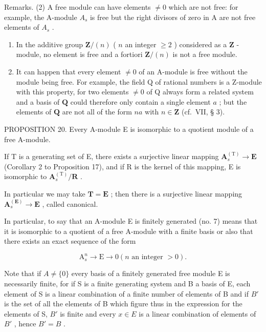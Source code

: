 Remarks. (2) A free module can have elements \(\neq0\) which are not free: for example, the A-module \(A_{s}\) is free but the right divisors of zero in A are not free elements of \(A_{s}\) .

\begin{enumerate}
\def\labelenumi{(\arabic{enumi})}
\setcounter{enumi}{2}
\item
  In the additive group \(\mathbf{Z} / (n)\) ( \(n\) an integer \(\geqslant 2\) ) considered as a \(\mathbf{Z}\) -module, no element is free and a fortiori \(\mathbf{Z} / (n)\) is not a free module.
\item
  It can happen that every element \(\neq0\) of an A-module is free without the module being free. For example, the field Q of rational numbers is a Z-module with this property, for two elements \(\neq0\) of Q always form a related system and a basis of \(\mathbf{Q}\) could therefore only contain a single element \(a\) ; but the elements of \(\mathbf{Q}\) are not all of the form \(na\) with \(n \in \mathbf{Z}\) (cf.~VII, § 3).
\end{enumerate}

PROPOSITION 20. Every A-module E is isomorphic to a quotient module of a free A-module.

If T is a generating set of E, there exists a surjective linear mapping \(\mathbf{A}_{s}^{(\mathrm{T})}\to\mathbf{E}\) (Corollary 2 to Proposition 17), and if R is the kernel of this mapping, E is isomorphic to \(\mathbf{A}_{s}^{(\mathrm{T})}/\mathbf{R}\) .

In particular we may take \(\mathbf{T} = \mathbf{E}\) ; then there is a surjective linear mapping \(\mathbf{A}_s^{(\mathbf{E})} \to \mathbf{E}\) , called canonical.

In particular, to say that an A-module E is finitely generated (no. 7) means that it is isomorphic to a quotient of a free A-module with a finite basis or also that there exists an exact sequence of the form

\[
\mathrm{A} _ {s} ^ {n} \rightarrow \mathrm{E} \rightarrow 0 (n \text {   an   integer   } > 0).
\]

Note that if \(A \neq \{0\}\) every basis of a finitely generated free module E is necessarily finite, for if S is a finite generating system and B a basis of E, each element of S is a linear combination of a finite number of elements of B and if \(B'\) is the set of all the elements of B which figure thus in the expression for the elements of S, \(B'\) is finite and every \(x \in E\) is a linear combination of elements of \(B'\) , hence \(B' = B\) .

